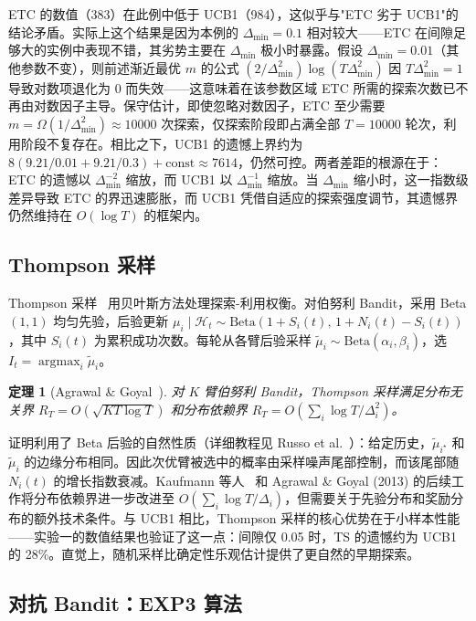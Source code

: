 \documentclass[UTF8,a4paper,11pt,zihao=5]{ctexart}
\newtheorem{theorem}{定理}[section]
\newcommand{\argmax}{\mathop{\arg\max}}
\newcommand{\regret}[1]{R_{#1}}
\begin{document}
ETC 的数值（383）在此例中低于 UCB1（984），这似乎与"ETC 劣于 UCB1"的结论矛盾。实际上这个结果是因为本例的 $\Delta_{\min}=0.1$ 相对较大——ETC 在间隙足够大的实例中表现不错，其劣势主要在 $\Delta_{\min}$ 极小时暴露。假设 $\Delta_{\min}=0.01$（其他参数不变），则前述渐近最优 $m$ 的公式 $(2/\Delta_{\min}^2)\log(T\Delta_{\min}^2)$ 因 $T\Delta_{\min}^2 = 1$ 导致对数项退化为 0 而失效——这意味着在该参数区域 ETC 所需的探索次数已不再由对数因子主导。保守估计，即使忽略对数因子，ETC 至少需要 $m = \Omega(1/\Delta_{\min}^2) \approx 10000$ 次探索，仅探索阶段即占满全部 $T=10000$ 轮次，利用阶段不复存在。相比之下，UCB1 的遗憾上界约为 $8(9.21/0.01 + 9.21/0.3) + \text{const} \approx 7614$，仍然可控。两者差距的根源在于：ETC 的遗憾以 $\Delta_{\min}^{-2}$ 缩放，而 UCB1 以 $\Delta_{\min}^{-1}$ 缩放。当 $\Delta_{\min}$ 缩小时，这一指数级差异导致 ETC 的界迅速膨胀，而 UCB1 凭借自适应的探索强度调节，其遗憾界仍然维持在 $O(\log T)$ 的框架内。

\subsection{Thompson 采样}

Thompson 采样~\cite{thompson1933} 用贝叶斯方法处理探索-利用权衡。对伯努利 Bandit，采用 Beta$(1,1)$ 均匀先验，后验更新 $\mu_i \mid \mathcal{H}_t \sim \text{Beta}(1 + S_i(t),\, 1 + N_i(t) - S_i(t))$，其中 $S_i(t)$ 为累积成功次数。每轮从各臂后验采样 $\tilde{\mu}_i \sim \text{Beta}(\alpha_i, \beta_i)$，选 $I_t = \argmax_i \tilde{\mu}_i$。

\begin{theorem}[Agrawal \& Goyal~\cite{agrawal2012}]\label{thm:ts}
对 $K$ 臂伯努利 Bandit，Thompson 采样满足分布无关界 $\regret{T} = O(\sqrt{KT \log T})$ 和分布依赖界 $\regret{T} = O(\sum_i \log T / \Delta_i^{2})$。
\end{theorem}

证明利用了 Beta 后验的自然性质（详细教程见 Russo et al.~\cite{russo2018}）：给定历史，$\tilde{\mu}_{i^\star}$ 和 $\tilde{\mu}_i$ 的边缘分布相同。因此次优臂被选中的概率由采样噪声尾部控制，而该尾部随 $N_i(t)$ 的增长指数衰减。Kaufmann 等人~\cite{kaufmann2012} 和 Agrawal \& Goyal (2013) 的后续工作将分布依赖界进一步改进至 $O(\sum_i \log T / \Delta_i)$，但需要关于先验分布和奖励分布的额外技术条件。与 UCB1 相比，Thompson 采样的核心优势在于小样本性能——实验一的数值结果也验证了这一点：间隙仅 0.05 时，TS 的遗憾约为 UCB1 的 28\%。直觉上，随机采样比确定性乐观估计提供了更自然的早期探索。

\subsection{对抗 Bandit：EXP3 算法}
\end{document}
